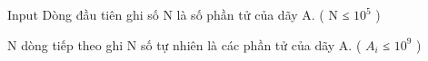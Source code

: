 Input
Dòng đầu tiên ghi số N là số phần tử của dãy A. ( N ≤ $10^{5}$   )  

   N dòng tiếp theo ghi N số tự nhiên là các phần tử của dãy A. (  $A_{i}$   ≤ $10^{9}$   )